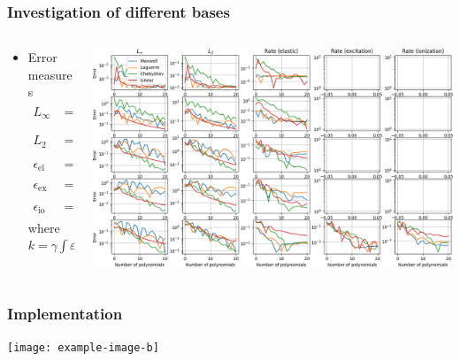 \documentclass[mathserif, aspectratio=169]{beamer}
\newcommand{\ud}{\,\mathrm{d}}
\begin{document}
\begin{frame}
\frametitle{Investigation of different bases}
%
\begin{columns}[T]
\begin{column}{0.3\linewidth}
\begin{itemize}
\item Error measures
\begin{align*}
L_\infty &= \max | f - f_{\text{app}} |
\\
L_2 &= \sqrt{\int | f - f_{\text{app}} |^2 \ud v}
\\
\epsilon_\text{el} &= | k_\text{el} - k_\text{el}^\text{app}|
\\
\epsilon_\text{ex} &= | k_\text{ex} - k_\text{ex}^\text{app}|
\\
\epsilon_\text{io} &= | k_\text{io} - k_\text{io}^\text{app}|
\end{align*}
where
$k = \gamma \int \varepsilon \sigma f \ud \varepsilon$
\end{itemize}
\end{column}
\begin{column}{0.7\linewidth}
  \vspace{-0.35in}
  \begin{center}
   \includegraphics[width=\textwidth]{figures/bolsig_convergence.png}
  \end{center}
\end{column}
\end{columns}
%
\end{frame}



\begin{frame}
\frametitle{Implementation}
%
\begin{center}
   \texttt{[image: example-image-b]}
\end{center}
%
\end{frame}


\end{document}
